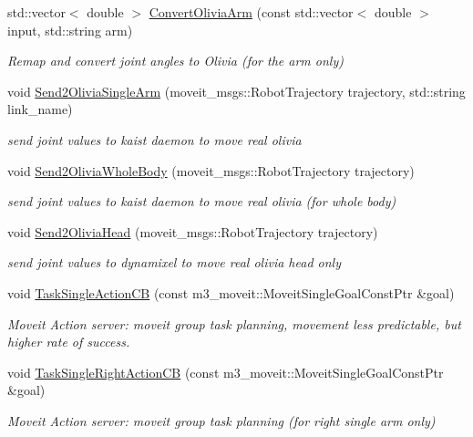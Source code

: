 \begin{DoxyCompactItemize}
std\+::vector$<$ double $>$ \hyperlink{classM3MoveGroup_a422eebf405bc0b3187bb6e692b361fa0}{Convert\+Olivia\+Arm} (const std\+::vector$<$ double $>$ input, std\+::string arm)
\begin{DoxyCompactList}\small\item\em Remap and convert joint angles to Olivia (for the arm only) \end{DoxyCompactList}\item 
void \hyperlink{classM3MoveGroup_a0b0b4680d729b8878a89ba03c6d59303}{Send2\+Olivia\+Single\+Arm} (moveit\+\_\+msgs\+::\+Robot\+Trajectory trajectory, std\+::string link\+\_\+name)
\begin{DoxyCompactList}\small\item\em send joint values to kaist daemon to move real olivia \end{DoxyCompactList}\item 
void \hyperlink{classM3MoveGroup_a8adcfcf74c2e2350189be855dca572de}{Send2\+Olivia\+Whole\+Body} (moveit\+\_\+msgs\+::\+Robot\+Trajectory trajectory)
\begin{DoxyCompactList}\small\item\em send joint values to kaist daemon to move real olivia (for whole body) \end{DoxyCompactList}\item 
void \hyperlink{classM3MoveGroup_a5f4c7d0260a2d987e5abaf1b1365c657}{Send2\+Olivia\+Head} (moveit\+\_\+msgs\+::\+Robot\+Trajectory trajectory)
\begin{DoxyCompactList}\small\item\em send joint values to dynamixel to move real olivia head only \end{DoxyCompactList}\item 
void \hyperlink{classM3MoveGroup_a5cbdff90f02f8067d55c1b4592b24b72}{Task\+Single\+Action\+CB} (const m3\+\_\+moveit\+::\+Moveit\+Single\+Goal\+Const\+Ptr \&goal)
\begin{DoxyCompactList}\small\item\em Moveit Action server\+: moveit group task planning, movement less predictable, but higher rate of success. \end{DoxyCompactList}\item 
void \hyperlink{classM3MoveGroup_aee17065b5aa40384dcca5a6589261ded}{Task\+Single\+Right\+Action\+CB} (const m3\+\_\+moveit\+::\+Moveit\+Single\+Goal\+Const\+Ptr \&goal)
\begin{DoxyCompactList}\small\item\em Moveit Action server\+: moveit group task planning (for right single arm only) \end{DoxyCompactList}\item 

\end{DoxyCompactItemize}
